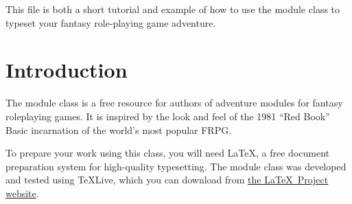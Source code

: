 \documentclass[a4paper,serif]{module}
\begin{document}


\maketitle



%

\showtitle

This file is both a short tutorial and example of how to use the module class to typeset your fantasy role-playing game adventure.

\part{Introduction}

The module class is a free resource for authors of adventure modules for fantasy roleplaying games.
It is inspired by the look and feel of the 1981 ``Red Book'' Basic incarnation of the world's most popular FRPG.

To prepare your work using this class, you will need \LaTeX, a free document preparation system for high-quality
typesetting. The module class was developed and tested using \TeX Live, which you can download from
\href{https://latex-project.org/ftp.html}{the \LaTeX~Project website}.
\end{document}
